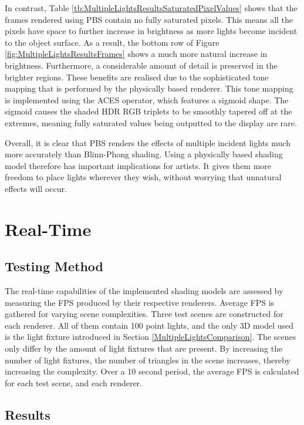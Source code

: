 In contrast, Table \ref{tb:MultipleLightsResultsSaturatedPixelValues} shows that the frames rendered using PBS contain no fully saturated pixels. This means all the pixels have space to further increase in brightness as more lights become incident to the object surface. As a result, the bottom row of Figure \ref{fig:MultipleLightsResultsFrames} shows a much more natural increase in brightness. Furthermore, a considerable amount of detail is preserved in the brighter regions. These benefits are realised due to the sophisticated tone mapping that is performed by the physically based renderer. This tone mapping is implemented using the ACES operator, which features a sigmoid shape. The sigmoid causes the shaded HDR RGB triplets to be smoothly tapered off at the extremes, meaning fully saturated values being outputted to the display are rare.

Overall, it is clear that PBS renders the effects of multiple incident lights much more accurately than Blinn-Phong shading. Using a physically based shading model therefore has important implications for artists. It gives them more freedom to place lights wherever they wish, without worrying that unnatural effects will occur.

\section{Real-Time}

\subsection{Testing Method}

The real-time capabilities of the implemented shading models are assessed by measuring the FPS produced by their respective renderers. Average FPS is gathered for varying scene complexities. Three test scenes are constructed for each renderer. All of them contain 100 point lights, and the only 3D model used is the light fixture introduced in Section \ref{MultipleLightsComparison}. The scenes only differ by the amount of light fixtures that are present. By increasing the number of light fixtures, the number of triangles in the scene increases, thereby increasing the complexity. Over a 10 second period, the average FPS is calculated for each test scene, and each renderer.

\subsection{Results}

